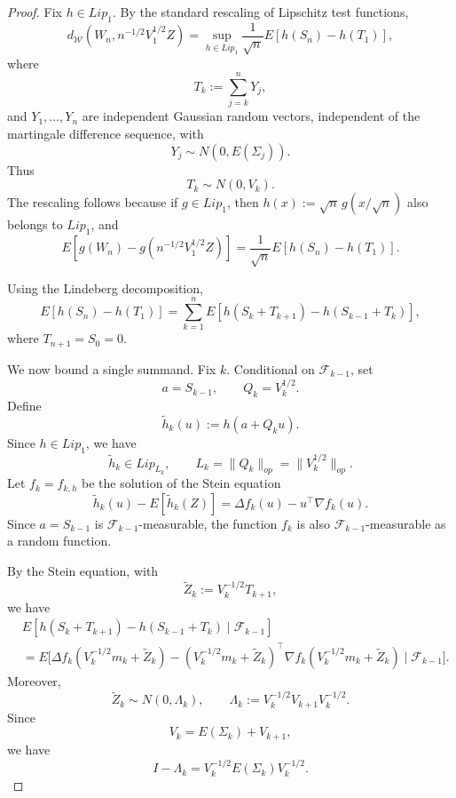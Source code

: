 \documentclass[11pt]{article}
\begin{document}
\begin{proof}
Fix \(h\in Lip_1\). By the standard rescaling of Lipschitz test functions,
\[
d_{\mathcal W}(W_n,n^{-1/2}V_1^{1/2}Z)
=
\sup_{h\in Lip_1}
\frac{1}{\sqrt n}
E\left[h(S_n)-h(T_1)\right],
\]
where
\[
    T_k:=\sum_{j=k}^n Y_j,
\]
and \(Y_1,\ldots,Y_n\) are independent Gaussian random vectors, independent
of the martingale difference sequence, with
\[
    Y_j\sim N(0,E(\Sigma_j)).
\]
Thus
\[
    T_k\sim N(0,V_k).
\]
The rescaling follows because if \(g\in Lip_1\), then
\(h(x):=\sqrt n\,g(x/\sqrt n)\) also belongs to \(Lip_1\), and
\[
E\left[g(W_n)-g(n^{-1/2}V_1^{1/2}Z)\right]
=
\frac{1}{\sqrt n}
E\left[h(S_n)-h(T_1)\right].
\]

Using the Lindeberg decomposition,
\[
E\left[h(S_n)-h(T_1)\right]
=
\sum_{k=1}^n
E\left[
h(S_k+T_{k+1})-h(S_{k-1}+T_k)
\right],
\]
where \(T_{n+1}=S_0=0\).

We now bound a single summand. Fix \(k\). Conditional on
\(\mathcal F_{k-1}\), set
\[
    a=S_{k-1},
    \qquad
    Q_k=V_k^{1/2}.
\]
Define
\[
    \widetilde h_k(u):=h(a+Q_k u).
\]
Since \(h\in Lip_1\), we have
\[
    \widetilde h_k\in Lip_{L_k},
    \qquad
    L_k=\|Q_k\|_{op}=\|V_k^{1/2}\|_{op}.
\]
Let \(f_k=f_{k,h}\) be the solution of the Stein equation
\[
    \widetilde h_k(u)-E[\widetilde h_k(Z)]
    =
    \Delta f_k(u)-u^\top\nabla f_k(u).
\]
Since \(a=S_{k-1}\) is \(\mathcal F_{k-1}\)-measurable, the function
\(f_k\) is also \(\mathcal F_{k-1}\)-measurable as a random function.

By the Stein equation, with
\[
    \widetilde Z_k:=V_k^{-1/2}T_{k+1},
\]
we have
\begin{align*}
& E\left[
h(S_k+T_{k+1})-h(S_{k-1}+T_k)
\mid
\mathcal F_{k-1}
\right]
\\
&=
E\biggl[
\Delta f_k\left(V_k^{-1/2}m_k+\widetilde Z_k\right)
-
\left(V_k^{-1/2}m_k+\widetilde Z_k\right)^\top
\nabla f_k\left(V_k^{-1/2}m_k+\widetilde Z_k\right)
\mid
\mathcal F_{k-1}
\biggr].
\end{align*}
Moreover,
\[
    \widetilde Z_k
    \sim
    N(0,\Lambda_k),
    \qquad
    \Lambda_k:=V_k^{-1/2}V_{k+1}V_k^{-1/2}.
\]
Since
\[
    V_k=E(\Sigma_k)+V_{k+1},
\]
we have
\[
    I-\Lambda_k
    =
    V_k^{-1/2}E(\Sigma_k)V_k^{-1/2}.
\]


\end{proof}
\end{document}
